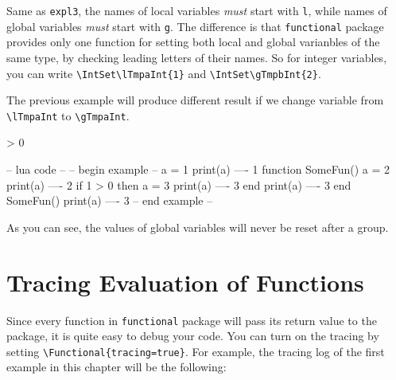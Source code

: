\documentclass[oneside]{book}
\begin{document}
Same as \verb!expl3!, the names of local variables \emph{must} start with \verb!l!,
while names of global variables \emph{must} start with \verb!g!.
The difference is that \verb!functional! package provides only one function for setting
both local and global varianbles of the same type,
by checking leading letters of their names. So for integer variables, you can write
\verb!\IntSet\lTmpaInt{1}! and \verb!\IntSet\gTmpbInt{2}!.

The previous example will produce different result
if we change variable from \verb!\lTmpaInt! to \verb!\gTmpaInt!.

\begin{minipage}{0.58\textwidth}
\begin{codehigh}
\IgnoreSpacesOn
\IntSet {}
\IntVarLog \gTmpaInt            %
\PrgNewFunction \SomeFun { } {
  \IntSet {}
  \IntVarLog \gTmpaInt          %
   > {0} {
    \IntSet {}
    \IntVarLog \gTmpaInt        %
  }{ }
  \IntVarLog \gTmpaInt          %
}
\SomeFun
\IntVarLog \gTmpaInt            %
\IgnoreSpacesOff
\end{codehigh}
\end{minipage}%
\begin{minipage}{0.42\textwidth}
\begin{code}
-- lua code --
-- begin example --
a = 1
print(a)            ---- 1
function SomeFun()
  a = 2
  print(a)          ---- 2
  if 1 > 0 then
    a = 3
    print(a)        ---- 3
  end
  print(a)          ---- 3
end
SomeFun()
print(a)            ---- 3
-- end example --
\end{code}
\end{minipage}

As you can see, the values of global variables will never be reset after a group.

\section{Tracing Evaluation of Functions}

Since every function in \verb!functional! package will pass its return value to
the package, it is quite easy to debug your code.
You can turn on the tracing by setting \verb!\Functional{tracing=true}!.
For example, the tracing log of the first example in this chapter will be the following:
\end{document}

